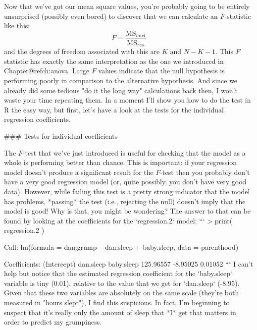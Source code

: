 Now that we've got our mean square values, you're probably going to be entirely unsurprised (possibly even bored) to discover that we can calculate an $F$-statistic like this:
$$
F =  \frac{\mbox{MS}_{mod}}{\mbox{MS}_{res}}
$$
and the degrees of freedom associated with this are $K$ and $N-K-1$. This $F$ statistic has exactly the same interpretation as the one we introduced in Chapter@refch:anova. Large $F$ values indicate that the null hypothesis is performing poorly in comparison to the alternative hypothesis. And since we already did some tedious "do it the long way" calculations back then, I won't waste your time repeating them. In a moment I'll show you how to do the test in R the easy way, but first, let's have a look at the tests for the individual regression coefficients.


### Tests for individual coefficients

The $F$-test that we've just introduced is useful for checking that the model as a whole is performing better than chance. This is important: if your regression model doesn't produce a significant result for the $F$-test then you probably don't have a very good regression model (or, quite possibly, you don't have very good data). However, while failing this test is a pretty strong indicator that the model has problems, *passing* the test (i.e., rejecting the null) doesn't imply that the model is good! Why is that, you might be wondering? The answer to that can be found by looking at the coefficients for the `regression.2` model:
```
> print( regression.2 )

Call:
lm(formula = dan.grump ~ dan.sleep + baby.sleep, data = parenthood)

Coefficients:
(Intercept)    dan.sleep   baby.sleep  
  125.96557     -8.95025      0.01052  
```
I can't help but notice that the estimated regression coefficient for the `baby.sleep` variable is tiny (0.01), relative to the value that we get for `dan.sleep` (-8.95). Given that these two variables are absolutely on the same scale (they're both measured in "hours slept"), I find this suspicious. In fact, I'm beginning to suspect that it's really only the amount of sleep that *I* get that matters in order to predict my grumpiness.

